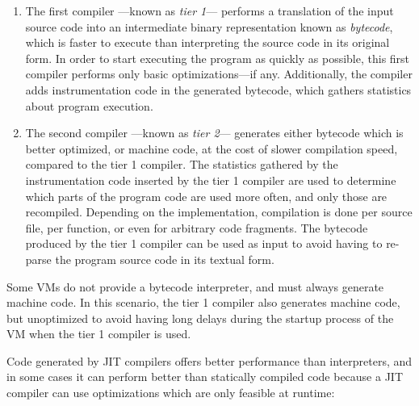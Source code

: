 \begin{enumerate}

		\item The first compiler —known as \emph{tier 1}— performs a translation
		of the input source code into an intermediate binary representation known
		as \emph{bytecode}, which is faster to execute than interpreting the
		source code in its original form. In order to start executing the
		program as quickly as possible, this first compiler performs only basic
		optimizations—if any. Additionally, the compiler adds instrumentation code
		in the generated bytecode, which gathers statistics about program execution.
		
		\item The second compiler —known as \emph{tier 2}— generates either
		bytecode which is better optimized, or machine code, at the cost of
		slower compilation speed, compared to the tier 1 compiler. The
		statistics gathered by the instrumentation code inserted by the tier
		1 compiler are used to determine which parts of the program code are used
		more often, and only those are recompiled. Depending on the
		implementation, compilation is done per source file, per function, or even
		for arbitrary code fragments. The bytecode produced by the tier 1 compiler
		can be used as input to avoid having to re-parse the program source code
		in its textual form.

\end{enumerate}
		
Some VMs do not provide a bytecode interpreter, and must always generate
machine code. In this scenario, the tier 1 compiler also generates machine
code, but unoptimized to avoid having long delays during the startup process
of the VM when the tier 1 compiler is used.

Code generated by JIT compilers offers better performance than interpreters,
and in some cases it can perform better than statically compiled code because
a JIT compiler can use optimizations which are only feasible at runtime:

